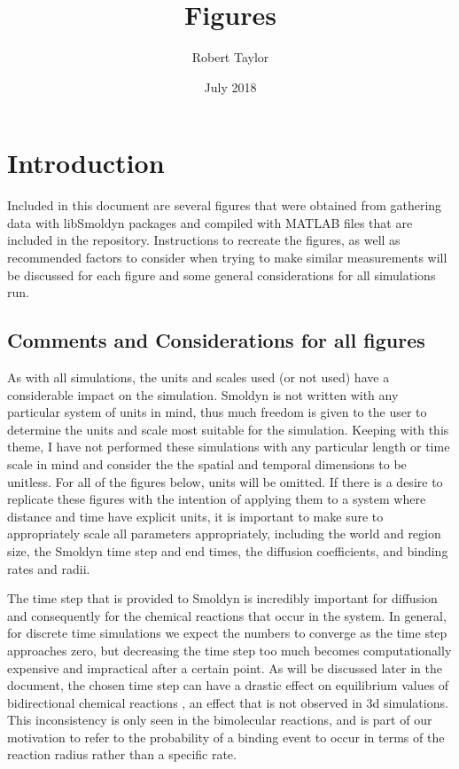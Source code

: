 \documentclass{article}
\title{Figures}
\author{Robert Taylor}
\date{July 2018}
\begin{document}
\maketitle

\section{Introduction}
Included in this document are several figures that were obtained from gathering data with libSmoldyn packages and compiled with MATLAB files that are included in the repository. Instructions to recreate the figures, as well as recommended factors to consider when trying to make similar measurements will be discussed for each figure and some general considerations for all simulations run.

\subsection{Comments and Considerations for all figures}

As with all simulations, the units and scales used (or not used) have a considerable impact on the simulation. Smoldyn is not written with any particular system of units in mind, thus much freedom is given to the user to determine the units and scale most suitable for the simulation. Keeping with this theme, I have not performed these simulations with any particular length or time scale in mind and consider the the spatial and temporal dimensions to be unitless. For all of the figures below, units will be omitted. If there is a desire to replicate these figures with the intention of applying them to a system where distance and time have explicit units, it is important to make sure to appropriately scale all parameters appropriately, including the world and region size, the Smoldyn time step and end times, the diffusion coefficients, and binding rates and radii.

The time step that is provided to Smoldyn is incredibly important for diffusion and consequently for the chemical reactions that occur in the system. In general, for discrete time simulations we expect the numbers to converge as the time step approaches zero, but decreasing the time step too much becomes computationally expensive and impractical after a certain point. As will be discussed later in the document, the chosen time step can have a drastic effect on equilibrium values of bidirectional chemical reactions , an effect that is not observed in 3d simulations. This inconsistency is only seen in the bimolecular reactions, and is part of our motivation to refer to the probability of a binding event to occur in terms of the reaction radius rather than a specific rate.
\end{document}

